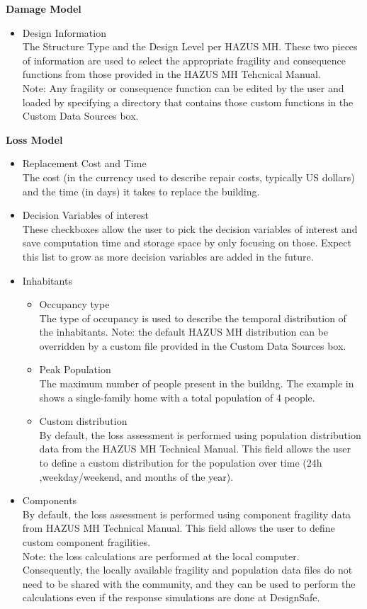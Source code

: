 \textbf{Damage Model}

\begin{itemize}
    \item Design Information\\
    The Structure Type and the Design Level per HAZUS MH. These two pieces of information are used to select the appropriate fragility and consequence functions from those provided in the HAZUS MH Tehcnical Manual.\\
    Note: Any fragility or consequence function can be edited by the user and loaded by specifying a directory that contains those custom functions in the Custom Data Sources box.
\end{itemize}

\textbf{Loss Model}

\begin{itemize}
    \item Replacement Cost and Time\\
    The cost (in the currency used to describe repair costs, typically US dollars) and the time (in days) it takes to replace the building.
    \item Decision Variables of interest\\
    These checkboxes allow the user to pick the decision variables of interest and save computation time and storage space by only focusing on those. Expect this list to grow as more decision variables are added in the future.
    \item Inhabitants
    \begin{itemize}
        \item Occupancy type\\
        The type of occupancy is used to describe the temporal distribution of the inhabitants. Note: the default HAZUS MH distribution can be overridden by a custom file provided in the Custom Data Sources box.
        \item Peak Population\\
        The maximum number of people present in the buildng. The example in  shows a single-family home with a total population of 4 people.
        \item Custom distribution\\
        By default, the loss assessment is performed using population distribution data from the HAZUS MH Technical Manual. This field allows the user to define a custom distribution for the population over time (24h ,weekday/weekend, and months of the year).
	\end{itemize}
	\item Components\\
	By default, the loss assessment is performed using component fragility data from HAZUS MH Technical Manual. This field allows the user to define custom component fragilities.\\
	Note: the loss calculations are performed at the local computer. Consequently, the locally available fragility and population data files do not need to be shared with the community, and they can be used to perform the calculations even if the response simulations are done at DesignSafe.
\end{itemize}